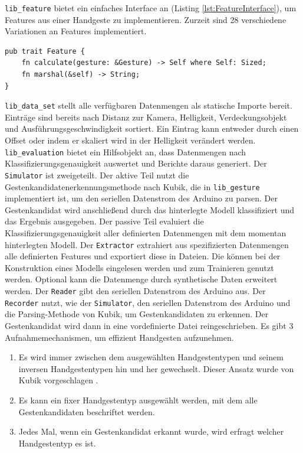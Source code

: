 \texttt{lib\_feature} bietet ein einfaches Interface an (Listing \ref{lst:FeatureInterface}), um Features aus einer Handgeste zu implementieren. Zurzeit sind 28 verschiedene Variationen an Features implementiert.
\begin{lstlisting}[label=lst:FeatureInterface,caption={Das Interface, um ein Feature zu implementieren.}]
pub trait Feature {
    fn calculate(gesture: &Gesture) -> Self where Self: Sized;
    fn marshal(&self) -> String;
}
\end{lstlisting}
\texttt{lib\_data\_set} stellt alle verfügbaren Datenmengen als statische Importe bereit. Einträge sind bereits nach Distanz zur Kamera, Helligkeit, Verdeckungsobjekt und Ausführungsgeschwindigkeit sortiert. Ein
Eintrag kann entweder durch einen Offset oder indem er skaliert wird in der Helligkeit verändert werden.
\newline
\newline
\texttt{lib\_evaluation} bietet ein Hilfsobjekt an, dass Datenmengen nach Klassifizierungsgenauigkeit auswertet und Berichte daraus generiert.
\newline
\newline
Der \texttt{Simulator} ist zweigeteilt. Der aktive Teil nutzt die Gestenkandidatenerkennungsmethode nach Kubik, die in \texttt{lib\_gesture} implementiert ist, um den seriellen Datenstrom des Arduino zu parsen. Der
Gestenkandidat wird anschließend durch das hinterlegte Modell klassifiziert und das Ergebnis ausgegeben. Der passive Teil evaluiert die Klassifizierungsgenauigkeit aller definierten Datenmengen mit dem momentan
hinterlegten Modell.
\newline
\newline
Der \texttt{Extractor} extrahiert aus spezifizierten Datenmengen alle definierten Features und exportiert diese in Dateien. Die können bei der Konstruktion eines Modells eingelesen werden und zum Trainieren
genutzt werden. Optional kann die Datenmenge durch synthetische Daten erweitert werden.
\newline
\newline
Der \texttt{Reader} gibt den seriellen Datenstrom des Arduino aus.
\newline
\newline
Der \texttt{Recorder} nutzt, wie der \texttt{Simulator}, den seriellen Datenstrom des Arduino und die Parsing-Methode von Kubik, um Gestenkandidaten zu erkennen.
Der Gestenkandidat wird dann in eine vordefinierte Datei reingeschrieben. Es gibt 3 Aufnahmemechanismen, um effizient Handgesten aufzunehmen.
\begin{enumerate}
    \item Es wird immer zwischen dem ausgewählten Handgestentypen und seinem inversen Handgestentypen hin und her gewechselt. Dieser Ansatz wurde von Kubik vorgeschlagen \cite{venzkeArticle}.
    \item Es kann ein fixer Handgestentyp ausgewählt werden, mit dem alle Gestenkandidaten beschriftet werden.
    \item Jedes Mal, wenn ein Gestenkandidat erkannt wurde, wird erfragt welcher Handgestentyp es ist.
\end{enumerate}